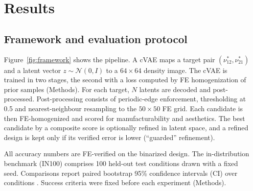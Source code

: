 \documentclass[a4paper,11pt]{article}
\newcommand{\nuot}{\nu_{12}}
\newcommand{\nuto}{\nu_{21}}
\begin{document}
\section{Results}

\subsection{Framework and evaluation protocol}

Figure~\ref{fig:framework} shows the pipeline. A cVAE maps a target pair
$(\nuot^{*},\nuto^{*})$ and a latent vector $z\sim\mathcal N(0,I)$ to a
$64\times64$ density image. The cVAE is trained in two stages, the second
with a loss computed by FE homogenization of prior samples (Methods). For
each target, $N$ latents are decoded and post-processed. Post-processing
consists of periodic-edge enforcement, thresholding at 0.5 and
nearest-neighbour resampling to the $50\times50$ FE grid. Each candidate is
then FE-homogenized and scored for manufacturability and aesthetics. The
best candidate by a composite score is optionally refined in latent space,
and a refined design is kept only if its verified error is lower (``guarded''
refinement).

All accuracy numbers are FE-verified on the binarized design. The
in-distribution benchmark (IN100) comprises 100 held-out test conditions
drawn with a fixed seed. Comparisons report paired bootstrap 95\% confidence
intervals (CI) over conditions \citep{efron1993bootstrap}. Success criteria
were fixed before each experiment (Methods).
\end{document}
